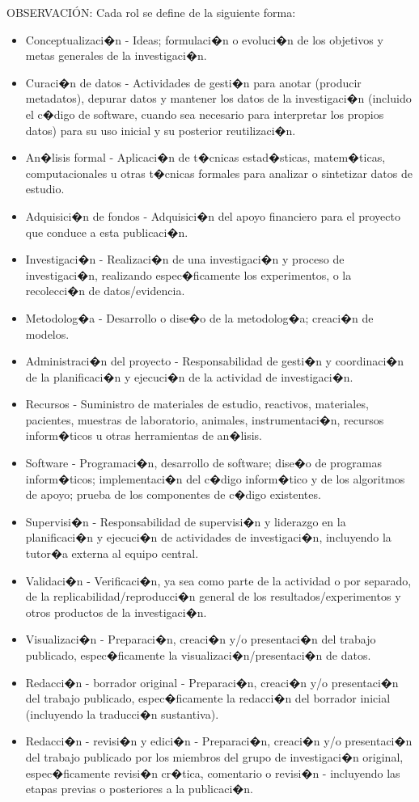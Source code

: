 \documentclass{rcci} %
\begin{document}
OBSERVACI\'ON:
Cada rol se define de la siguiente forma:
\begin{itemize}
	\item Conceptualizaci�n - Ideas; formulaci�n o evoluci�n de los objetivos y metas generales de la investigaci�n.
	\item Curaci�n de datos - Actividades de gesti�n para anotar (producir metadatos), depurar datos y mantener los datos de la investigaci�n (incluido el c�digo de software, cuando sea necesario para interpretar los propios datos) para su uso inicial y su posterior reutilizaci�n.
	\item An�lisis formal - Aplicaci�n de t�cnicas estad�sticas, matem�ticas, computacionales u otras t�cnicas formales para analizar o sintetizar datos de estudio.
	\item Adquisici�n de fondos - Adquisici�n del apoyo financiero para el proyecto que conduce a esta publicaci�n.
	\item Investigaci�n - Realizaci�n de una investigaci�n y proceso de investigaci�n, realizando espec�ficamente los experimentos, o la recolecci�n de datos/evidencia.
	\item Metodolog�a - Desarrollo o dise�o de la metodolog�a; creaci�n de modelos.
	\item Administraci�n del proyecto - Responsabilidad de gesti�n y coordinaci�n de la planificaci�n y ejecuci�n de la actividad de investigaci�n.
	\item Recursos - Suministro de materiales de estudio, reactivos, materiales, pacientes, muestras de laboratorio, animales, instrumentaci�n, recursos inform�ticos u otras herramientas de an�lisis.
	\item Software - Programaci�n, desarrollo de software; dise�o de programas inform�ticos; implementaci�n del c�digo inform�tico y de los algoritmos de apoyo; prueba de los componentes de c�digo existentes.
	\item Supervisi�n - Responsabilidad de supervisi�n y liderazgo en la planificaci�n y ejecuci�n de actividades de investigaci�n, incluyendo la tutor�a externa al equipo central.
	\item Validaci�n - Verificaci�n, ya sea como parte de la actividad o por separado, de la replicabilidad/reproducci�n general de los resultados/experimentos y otros productos de la investigaci�n.
	\item Visualizaci�n - Preparaci�n, creaci�n y/o presentaci�n del trabajo publicado, espec�ficamente la visualizaci�n/presentaci�n de datos.
	\item Redacci�n - borrador original - Preparaci�n, creaci�n y/o presentaci�n del trabajo publicado, espec�ficamente la redacci�n del borrador inicial (incluyendo la traducci�n sustantiva).
	\item Redacci�n - revisi�n y edici�n - Preparaci�n, creaci�n y/o presentaci�n del trabajo publicado por los miembros del grupo de investigaci�n original, espec�ficamente revisi�n cr�tica, comentario o revisi�n - incluyendo las etapas previas o posteriores a la publicaci�n.
\end{itemize}
\end{document}
